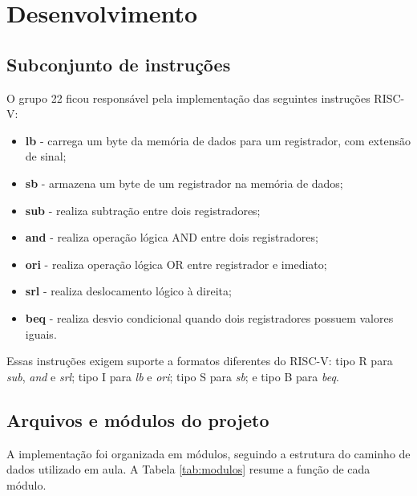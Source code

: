 \documentclass[12pt,a4paper]{article}
\begin{document}
\section{Desenvolvimento}

\subsection{Subconjunto de instruções}

O grupo 22 ficou responsável pela implementação das seguintes instruções RISC-V:

\begin{itemize}
    \item \textbf{lb} - carrega um byte da memória de dados para um registrador, com extensão de sinal;
    \item \textbf{sb} - armazena um byte de um registrador na memória de dados;
    \item \textbf{sub} - realiza subtração entre dois registradores;
    \item \textbf{and} - realiza operação lógica AND entre dois registradores;
    \item \textbf{ori} - realiza operação lógica OR entre registrador e imediato;
    \item \textbf{srl} - realiza deslocamento lógico à direita;
    \item \textbf{beq} - realiza desvio condicional quando dois registradores possuem valores iguais.
\end{itemize}

Essas instruções exigem suporte a formatos diferentes do RISC-V: tipo R para \textit{sub}, \textit{and} e \textit{srl}; tipo I para \textit{lb} e \textit{ori}; tipo S para \textit{sb}; e tipo B para \textit{beq}.

\subsection{Arquivos e módulos do projeto}

A implementação foi organizada em módulos, seguindo a estrutura do caminho de dados utilizado em aula. A Tabela \ref{tab:modulos} resume a função de cada módulo.
\end{document}
